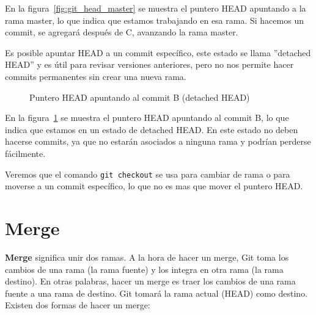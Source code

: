 \documentclass[a4paper,12pt]{report}
\begin{document}
En la figura~\ref{fig:git_head_master} se muestra el puntero HEAD apuntando a la rama master, lo que indica
que estamos trabajando en esa rama. Si hacemos un commit, se agregará después de C, avanzando la rama master.

Es posible apuntar HEAD a un commit específico, este estado se llama ''detached HEAD'' y es útil para revisar versiones anteriores,
pero no nos permite hacer commits permanentes sin crear una nueva rama.

\begin{figure}[h]
  \centering
  \caption{Puntero HEAD apuntando al commit B (detached HEAD)}
  \label{fig:git_head_B}
\end{figure}

En la figura~\ref{fig:git_head_B} se muestra el puntero HEAD apuntando al commit B, lo que indica que estamos
en un estado de detached HEAD. En este estado no deben hacerse commits, ya que no estarán asociados a ninguna
rama y podrían perderse fácilmente.

Veremos que el comando \texttt{git checkout} se usa para cambiar de rama o para moverse a un commit específico, lo que no es mas que
mover el puntero HEAD.

\section{Merge}

\textbf{Merge} significa unir dos ramas. A la hora de hacer un merge, Git toma los cambios de una rama (la rama fuente)
y los integra en otra rama (la rama destino). En otras palabras, hacer un merge es traer los cambios de una rama fuente
a una rama de destino. Git tomará la rama actual (HEAD) como destino.
Existen dos formas de hacer un merge:
\end{document}
